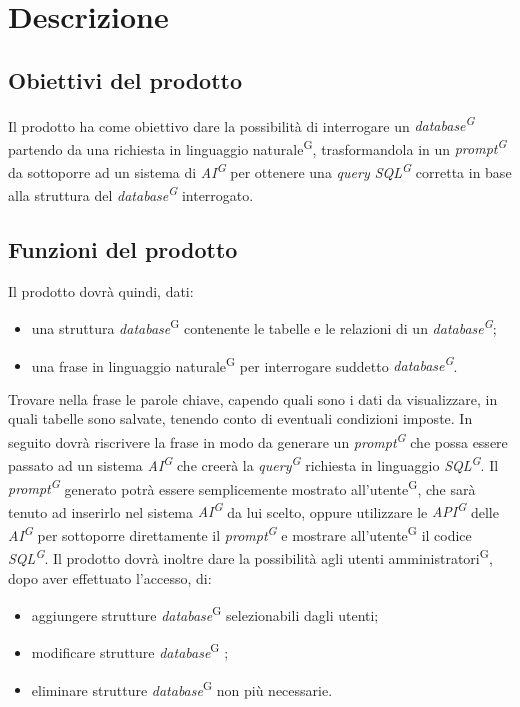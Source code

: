 \section{Descrizione}
\subsection{Obiettivi del prodotto}
Il prodotto ha come obiettivo dare la possibilità di interrogare un \textit{database\textsuperscript{G}} partendo da una richiesta in linguaggio naturale\textsuperscript{G}, trasformandola in un \textit{prompt\textsuperscript{G}} da sottoporre ad un sistema di \textit{AI\textsuperscript{G}} per ottenere una \textit{query SQL\textsuperscript{G}} corretta in base alla struttura del \textit{database\textsuperscript{G}} interrogato.

\subsection{Funzioni del prodotto}
Il prodotto dovrà quindi, dati:
\begin{itemize}
	\item una struttura \textit{database}\textsuperscript{G} contenente le tabelle e le relazioni di un \textit{database\textsuperscript{G}};
	\item una frase in linguaggio naturale\textsuperscript{G} per interrogare suddetto \textit{database\textsuperscript{G}}.
\end{itemize}
Trovare nella frase le parole chiave, capendo quali sono i dati da visualizzare, in quali tabelle sono salvate, tenendo conto di eventuali condizioni imposte.
In seguito dovrà riscrivere la frase in modo da generare un \textit{prompt\textsuperscript{G}} che possa essere passato ad un sistema \textit{AI\textsuperscript{G}} che creerà la \textit{query\textsuperscript{G}} richiesta in linguaggio \textit{SQL\textsuperscript{G}}.
Il \textit{prompt\textsuperscript{G}} generato potrà essere semplicemente mostrato all’utente\textsuperscript{G}, che sarà tenuto ad inserirlo nel sistema \textit{AI\textsuperscript{G}} da lui scelto, oppure utilizzare le \textit{API\textsuperscript{G}} delle \textit{AI\textsuperscript{G}} per sottoporre direttamente il \textit{prompt\textsuperscript{G}} e mostrare all’utente\textsuperscript{G} il codice \textit{SQL\textsuperscript{G}}.
Il prodotto dovrà inoltre dare la possibilità agli utenti amministratori\textsuperscript{G}, dopo aver effettuato l’accesso, di:
\begin{itemize}
	\item aggiungere strutture \textit{database}\textsuperscript{G} selezionabili dagli utenti;
	\item modificare strutture \textit{database}\textsuperscript{G} ;
	\item eliminare  strutture \textit{database}\textsuperscript{G}  non più necessarie.
\end{itemize}